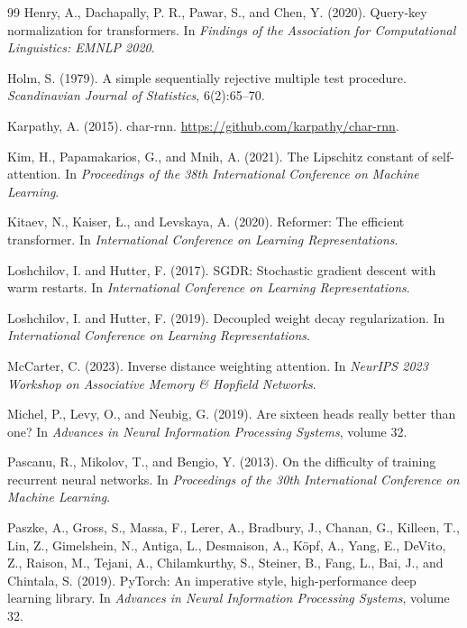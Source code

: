\documentclass[11pt]{article}
\begin{document}
\begin{thebibliography}{99}
Henry, A., Dachapally, P. R., Pawar, S., and Chen, Y. (2020).
Query-key normalization for transformers.
In \emph{Findings of the Association for Computational Linguistics: EMNLP 2020}.

Holm, S. (1979).
A simple sequentially rejective multiple test procedure.
\emph{Scandinavian Journal of Statistics}, 6(2):65--70.

Karpathy, A. (2015).
char-rnn.
\url{https://github.com/karpathy/char-rnn}.

Kim, H., Papamakarios, G., and Mnih, A. (2021).
The Lipschitz constant of self-attention.
In \emph{Proceedings of the 38th International Conference on Machine Learning}.

Kitaev, N., Kaiser, {\L}., and Levskaya, A. (2020).
Reformer: The efficient transformer.
In \emph{International Conference on Learning Representations}.

Loshchilov, I. and Hutter, F. (2017).
SGDR: Stochastic gradient descent with warm restarts.
In \emph{International Conference on Learning Representations}.

Loshchilov, I. and Hutter, F. (2019).
Decoupled weight decay regularization.
In \emph{International Conference on Learning Representations}.

McCarter, C. (2023).
Inverse distance weighting attention.
In \emph{NeurIPS 2023 Workshop on Associative Memory \& Hopfield Networks}.

Michel, P., Levy, O., and Neubig, G. (2019).
Are sixteen heads really better than one?
In \emph{Advances in Neural Information Processing Systems}, volume 32.

Pascanu, R., Mikolov, T., and Bengio, Y. (2013).
On the difficulty of training recurrent neural networks.
In \emph{Proceedings of the 30th International Conference on Machine Learning}.

Paszke, A., Gross, S., Massa, F., Lerer, A., Bradbury, J., Chanan, G., Killeen, T., Lin, Z., Gimelshein, N., Antiga, L., Desmaison, A., K\"opf, A., Yang, E., DeVito, Z., Raison, M., Tejani, A., Chilamkurthy, S., Steiner, B., Fang, L., Bai, J., and Chintala, S. (2019).
PyTorch: An imperative style, high-performance deep learning library.
In \emph{Advances in Neural Information Processing Systems}, volume 32.


\end{thebibliography}
\end{document}

